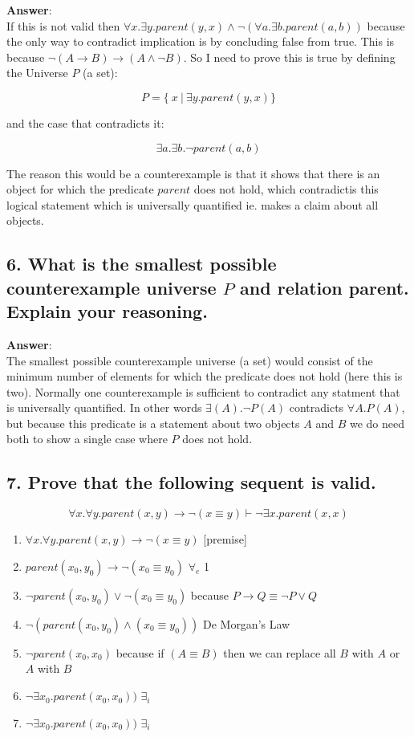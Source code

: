 \documentclass[a4paper, 14pt]{report}
\newcommand{\answer}[1]{%
	\begin{flushleft}
		\textbf{Answer}:\\
			#1
	\end{flushleft}}
\newcommand{\question}[1]{\subsection*{#1}}
\begin{document}
\answer{%
	If this is not valid then
	$ \forall{x}.\exists{y}.parent(y, x) \wedge \neg (\forall{a}.\exists{b}.parent(a, b)) $
	because the only way to contradict implication is by concluding false from true.
	This is because $ \neg (A \rightarrow B) \rightarrow (A \wedge \neg B)$.
	So I need to prove this is true by defining the Universe $P$ (a set):

	\[ P = \{\ x\ |\ \exists{y}.parent(y, x)\} \]

	and the case that contradicts it:

	\[ \exists{a}.\exists{b}.\neg parent(a, b) \]

	The reason this would be a counterexample is that it shows that
	there is an object for which the predicate $parent$ does not hold,
	which contradictis this logical statement which is universally
	quantified ie. makes a claim about all objects.
}

\pagebreak

\question{6. What is the smallest possible counterexample universe $ P $ and relation parent. Explain your reasoning.}

\answer{The smallest possible counterexample universe (a set) would consist
	of the minimum number of elements for which the predicate does not hold (here this is two). 
	Normally one counterexample  is sufficient to contradict any
  statment that is universally quantified. In other words $\exists(A).\neg P(A)$ 
  contradicts $\forall{A}.P(A)$, but because this predicate is a statement
  about two objects $A$ and $B$ we do need both to show a single case where
  $P$ does not hold.}

\question{7. Prove that the following sequent is valid.}

\[ \forall{x}.\forall{y}.parent(x, y) \rightarrow \neg(x \equiv y) \vdash \neg \exists{x}.parent(x, x) \]

\begin{enumerate}		
	\item $ \forall{x}.\forall{y}.parent(x, y) \rightarrow \neg(x \equiv y) $ [premise] \\
	\hline
	\item $ parent(x_0, y_0) \rightarrow \neg (x_0 \equiv y_0)  $ $ \forall_e $ 1
	\item $ \neg parent(x_0, y_0) \vee \neg (x_0 \equiv y_0) $  because $ P \rightarrow Q \equiv \neg P \vee Q $
  \item $ \neg (parent(x_0, y_0) \wedge (x_0 \equiv y_0)) $  De Morgan's Law 
	\item $ \neg parent(x_0, x_0) $  because if $ (A \equiv B ) $ then we can replace all $B$ with $A$ or $A$ with $B$ 
	\item $ \neg \exists{x_0}.parent(x_0, x_0)) $  $ \exists_i $ \\
	\hline
	\item $ \neg \exists{x_0}.parent(x_0, x_0)) $  $ \exists_i $
\end{enumerate}		
\end{document}
